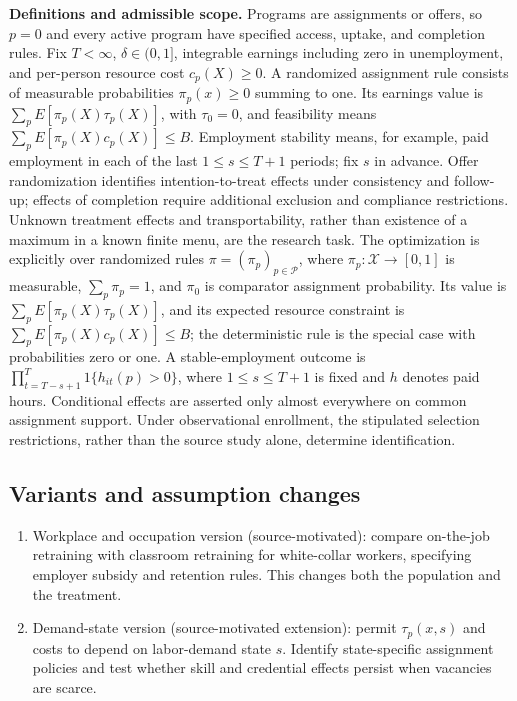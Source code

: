 \documentclass[11pt,a4paper]{article}
\begin{document}
\textbf{Definitions and admissible scope.} Programs are assignments or offers, so \(p=0\) and every active program have specified access, uptake, and completion rules. Fix \(T<\infty\), \(\delta\in(0,1]\), integrable earnings including zero in unemployment, and per-person resource cost \(c_p(X)\ge0\). A randomized assignment rule consists of measurable probabilities \(\pi_p(x)\ge0\) summing to one. Its earnings value is \(\sum_pE[\pi_p(X)\tau_p(X)]\), with \(\tau_0=0\), and feasibility means \(\sum_pE[\pi_p(X)c_p(X)]\le B\). Employment stability means, for example, paid employment in each of the last \(1\le s\le T+1\) periods; fix \(s\) in advance. Offer randomization identifies intention-to-treat effects under consistency and follow-up; effects of completion require additional exclusion and compliance restrictions. Unknown treatment effects and transportability, rather than existence of a maximum in a known finite menu, are the research task. The optimization is explicitly over randomized rules \(\pi=(\pi_p)_{p\in\mathcal P}\), where \(\pi_p:\mathcal X\to[0,1]\) is measurable, \(\sum_p\pi_p=1\), and \(\pi_0\) is comparator assignment probability. Its value is \(\sum_pE[\pi_p(X)\tau_p(X)]\), and its expected resource constraint is \(\sum_pE[\pi_p(X)c_p(X)]\le B\); the deterministic rule is the special case with probabilities zero or one. A stable-employment outcome is \(\prod_{t=T-s+1}^T1\{h_{it}(p)>0\}\), where \(1\le s\le T+1\) is fixed and \(h\) denotes paid hours. Conditional effects are asserted only almost everywhere on common assignment support. Under observational enrollment, the stipulated selection restrictions, rather than the source study alone, determine identification.
\subsection*{Variants and assumption changes}
\begin{enumerate}
\item Workplace and occupation version (source-motivated): compare on-the-job retraining with classroom retraining for white-collar workers, specifying employer subsidy and retention rules. This changes both the population and the treatment.
\item Demand-state version (source-motivated extension): permit \(\tau_p(x,s)\) and costs to depend on labor-demand state \(s\). Identify state-specific assignment policies and test whether skill and credential effects persist when vacancies are scarce.
\end{enumerate}
\end{document}

